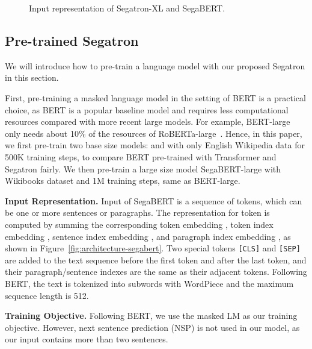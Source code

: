 \documentclass[letterpaper]{article}
\begin{document}
\begin{figure}[t]
  \centering
  \subfiguretopcaptrue
  
  \caption{Input representation of Segatron-XL and SegaBERT.}
  \label{fig:architecture}
\end{figure} \subsection{Pre-trained Segatron}
\label{section: model/segabert}
We will introduce how to pre-train a language model with our proposed Segatron in this section.

First, pre-training a masked language model in the setting of BERT is a practical choice, as BERT is a popular baseline model and requires less computational resources compared with more recent large models. 
For example, BERT-large only needs about 10\% of the resources of RoBERTa-large~\cite{DBLP:journals/corr/abs-1907-11692}.
Hence, in this paper, we first pre-train two base size models:  and  with only English Wikipedia data for 500K training steps, to compare BERT pre-trained with Transformer and Segatron fairly. 
We then pre-train a large size model SegaBERT-large with Wikibooks dataset and 1M training steps, same as BERT-large. 

\smallskip\noindent\textbf{Input Representation.} 
Input  of SegaBERT is a sequence of tokens, which can be one or more sentences or paragraphs.
The representation  for token  is computed by summing the corresponding token embedding , token index embedding , sentence index embedding , and paragraph index embedding , as shown in Figure~\ref{fig:architecture-segabert}.
Two special tokens \texttt{[CLS]} and \texttt{[SEP]} are added to the text sequence before the first token and after the last token, and their paragraph/sentence indexes are the same as their adjacent tokens.
Following BERT, the text is tokenized into subwords with WordPiece and the maximum sequence length is 512. 

\smallskip\noindent\textbf{Training Objective.}
Following BERT, we use the masked LM as our training objective.
However, next sentence prediction (NSP) is not used in our model, as our input contains more than two sentences.
\end{document}
